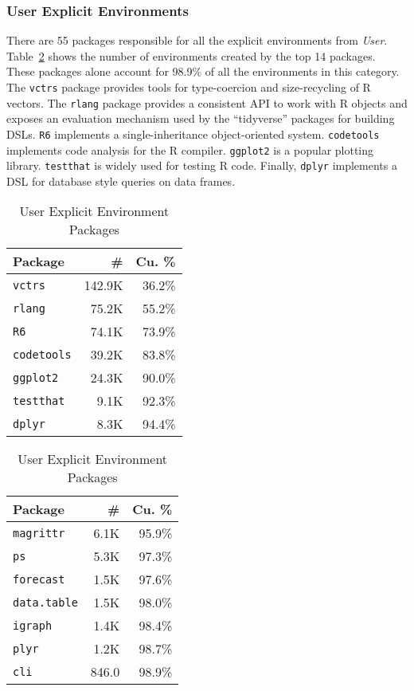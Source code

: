 \documentclass[10pt,review,sigplan,anonymous=true,authorversion=true,nonacm=true]{acmart}
\newcommand{\code}[1]{\lstinline |#1|\xspace}
\begin{document}
\subsubsection{User Explicit Environments}
There are 55 packages responsible for all the explicit environments from
\emph{User}. Table~\ref{table:user_explicit_pack} shows the number of
environments created by the top 14 packages. These packages alone account for
98.9\% of all the environments in this category. The \code{vctrs} package
provides tools for type-coercion and size-recycling of R vectors. The
\code{rlang} package provides a consistent API to work with R objects and
exposes an evaluation mechanism used by the ``tidyverse'' packages for building
DSLs. \code{R6} implements a single-inheritance object-oriented system.
\code{codetools} implements code analysis for the R compiler. \code{ggplot2} is
a popular plotting library. \code{testthat} is widely used for testing R code.
Finally, \code{dplyr} implements a DSL for database style queries on data
frames.

\begin{table}[!h]
  \vspace{-3mm}
  \small
  \caption{User Explicit Environment Packages} \label{table:user_explicit_pack}
  \centering
  \begin{tabular}{lrr}
    \toprule
    \textbf{Package}&\textbf{\#}&\textbf{Cu. \%}\\
    \midrule
    \code{vctrs}&142.9K&36.2\%\\
    \code{rlang}&75.2K&55.2\%\\
    \code{R6}&74.1K&73.9\%\\
    \code{codetools}&39.2K&83.8\%\\
    \code{ggplot2}&24.3K&90.0\%\\
    \code{testthat}&9.1K&92.3\%\\
    \code{dplyr}&8.3K&94.4\%\\
    \bottomrule
  \end{tabular}
  \begin{tabular}{lrr}
    \toprule
    \textbf{Package}&\textbf{\#}&\textbf{Cu. \%}\\
    \midrule
    \code{magrittr}&6.1K&95.9\%\\
    \code{ps}&5.3K&97.3\%\\
    \code{forecast}&1.5K&97.6\%\\
    \code{data.table}&1.5K&98.0\%\\
    \code{igraph}&1.4K&98.4\%\\
    \code{plyr}&1.2K&98.7\%\\
    \code{cli}&846.0&98.9\%\\
    \bottomrule
  \end{tabular}
\end{table}
\end{document}
